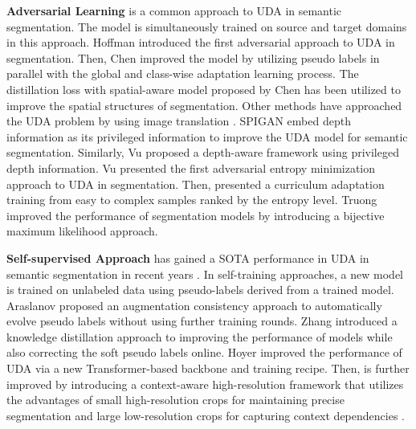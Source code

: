 \documentclass[10pt,twocolumn,letterpaper]{article}
\begin{document}
\noindent \textbf{Adversarial Learning} is a common approach to UDA in semantic segmentation. The model is simultaneously trained on source and target domains in this approach. Hoffman \etal \cite{hoffman2016fcns} introduced the first adversarial approach to UDA in segmentation. Then, Chen \etal \cite{chen2017no} improved the model by utilizing pseudo labels in parallel with the global and class-wise adaptation learning process. The distillation loss with spatial-aware model \cite{chen2018road} proposed by Chen \etal has been utilized to improve the spatial structures of segmentation. Other methods have approached the UDA problem by using image translation \cite{zhu2017unpaired, murez2018CVPR, hoffman18a}. SPIGAN \cite{lee2018spigan} embed depth information as its privileged information to improve the UDA model for semantic segmentation. Similarly, Vu \etal \cite{vu2019dada} proposed a depth-aware framework using privileged depth information. Vu \etal \cite{vu2019advent} presented the first adversarial entropy minimization approach to UDA in segmentation. Then, \cite{pan2020unsupervised, 10.1145/3474085.3475174} presented a curriculum adaptation training from easy to complex samples ranked by the entropy level. Truong \etal \cite{truong2021bimal, 9874820} improved the performance of segmentation models by introducing a bijective maximum likelihood approach. 

\noindent \textbf{Self-supervised Approach} has gained a SOTA performance in UDA in semantic segmentation in recent years \cite{zou2018unsupervised, Araslanov:2021:DASAC, zhang2021prototypical, daformer, procst}. In self-training approaches, a new model is trained on unlabeled data using pseudo-labels derived from a trained model. Araslanov \etal \cite{Araslanov:2021:DASAC} proposed an augmentation consistency approach to automatically evolve pseudo labels without using further training rounds. Zhang \etal \cite{zhang2021prototypical} introduced a knowledge distillation approach to improving the performance of models while also correcting the soft pseudo labels online. Hoyer \etal \cite{daformer} improved the performance of UDA via a new Transformer-based backbone and training recipe. Then, \cite{daformer} is further improved by introducing a context-aware high-resolution framework that utilizes the advantages of small high-resolution crops for maintaining precise segmentation and large low-resolution crops for capturing context dependencies \cite{hoyer2022hrda}.
\end{document}
